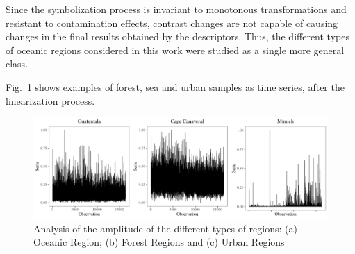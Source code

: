 \documentclass{isprs}
\begin{document}
	Since the symbolization process is invariant to monotonous transformations and resistant to contamination effects, contrast chan\-ges are not capable of causing changes in the final results obtained by the descriptors.
	Thus, the different types of oceanic regions considered in this work were studied as a single more general class.
	
	
	
	Fig.~\ref{fig:AmplitudeSAR} shows examples of forest, sea and urban samples as time series, after the linearization process.
	
	\begin{figure}[hbt]
		\includegraphics[width=\columnwidth]{Figures/SAR_signal.pdf}
		\caption{Analysis of the amplitude of the different types of regions: (a) Oceanic Region; (b) Forest Regions and (c) Urban Regions}
		\label{fig:AmplitudeSAR}
	\end{figure}
	
	
\end{document}
